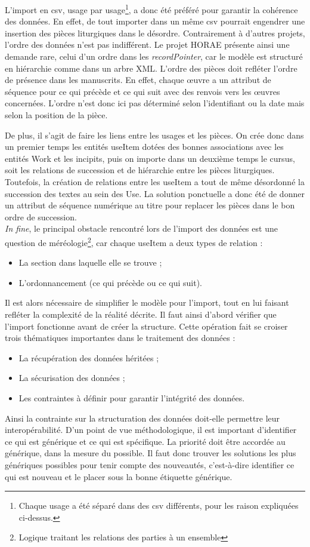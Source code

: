 \documentclass[a4paper,12pt,twoside]{book}
\begin{document}
L'import en csv, usage par usage\footnote{Chaque usage a été séparé dans des csv différents, pour les raison expliquées ci-dessus.}, a donc été préféré pour garantir la cohérence des données. En effet, de tout importer dans un même csv pourrait engendrer une insertion des pièces liturgiques dans le désordre. Contrairement à d'autres projets, l'ordre des données n'est pas indifférent. Le projet HORAE présente ainsi une demande rare, celui d'un ordre dans les \textit{recordPointer}, car le modèle est structuré en hiérarchie comme dans un arbre XML. L’ordre des pièces doit refléter l’ordre de présence dans les manuscrits. En effet, chaque œuvre a un attribut de séquence pour ce qui précède et ce qui suit avec des renvois vers les œuvres concernées. L’ordre n'est donc ici pas déterminé selon l’identifiant ou la date mais selon la position de la pièce. 

De plus, il s’agit de faire les liens entre les usages et les pièces. On crée donc dans un premier temps les entités useItem dotées des bonnes associations avec les entités Work et les incipits, puis on importe dans un deuxième temps le cursus, soit les relations de succession et de hiérarchie entre les pièces liturgiques. Toutefois, la création de relations entre les useItem a tout de même désordonné la succession des textes au sein des Use. La solution ponctuelle a donc été de donner un attribut de séquence numérique au titre pour replacer les pièces dans le bon ordre de succession.\\

\textit{In fine}, le principal obstacle rencontré lors de l'import des données est une question de méréologie\footnote{Logique traitant les relations des parties à un ensemble}, car chaque useItem a deux types de relation :
\begin{itemize}
    \item La section dans laquelle elle se trouve ;
    \item L'ordonnancement (ce qui précède ou ce qui suit).
\end{itemize}

Il est alors nécessaire de simplifier le modèle pour l’import, tout en lui faisant refléter la complexité de la réalité décrite. Il faut ainsi d’abord vérifier que l’import fonctionne avant de créer la structure. Cette opération fait se croiser trois thématiques importantes dans le traitement des données : 
\begin{itemize}
    \item La récupération des données héritées ;
    \item La sécurisation des données ;
    \item Les contraintes à définir pour garantir l'intégrité des données.
\end{itemize}
Ainsi la contrainte sur la structuration des données doit-elle permettre leur interopérabilité. D'un point de vue méthodologique, il est important d'identifier ce qui est générique et ce qui est spécifique. La priorité doit être accordée au générique, dans la mesure du possible. Il faut donc trouver les solutions les plus génériques possibles pour tenir compte des nouveautés, c'est-à-dire identifier ce qui est nouveau et le placer sous la bonne étiquette générique.
\end{document}

